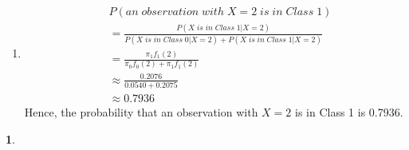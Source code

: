 \documentclass[10pt]{article}
\newtheorem{prob}{\bm{$Problem$}}
\begin{document}
\begin{enumerate}[1)]
\item
\begin{align*}
&P(an\;observation\;with\;X=2\;is\;in\;Class\;1)\\
&=\frac{P(X\;is\;in\;Class\;1|X=2)}{P(X\;is\;in\;Class\;0|X=2)+P(X\;is\;in\;Class\;1|X=2)}\\
&=\frac{\pi_1f_1(2)}{\pi_0f_0(2)+\pi_1f_1(2)}\\
&\approx\frac{0.2076}{0.0540+0.2075}\\
&\approx0.7936
\end{align*}
Hence, the probability that an observation with $X=2$ is in Class 1 is 0.7936. %
\end{enumerate}
\vspace{3mm}

\begin{prob}
\end{prob}
\end{document}
